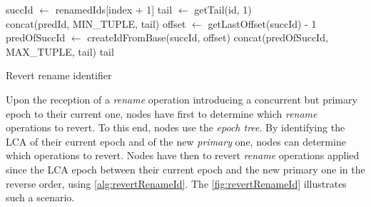 \documentclass[10pt,journal,compsoc]{IEEEtran}
\let\MYoriglatexcaption\caption
\renewcommand{\caption}[2][\relax]{\MYoriglatexcaption[#2]{#2}}
\begin{document}
\begin{myalgorithm}
\begin{algorithmic}
            \State succId $\gets$ renamedIds[index + 1]
            \State tail $\gets$ getTail(id, 1)
            \\
                \State \Return concat(predId, MIN\_TUPLE, tail)
                \State offset $\gets$ getLastOffset(succId) - 1
                \State predOfSuccId $\gets$ createIdFromBase(succId, offset)
                \State \Return concat(predOfSuccId, MAX\_TUPLE, tail)
            \Else
                \State \Return tail
            \EndIf
        \EndFunction
    \end{algorithmic}
    \caption{Revert rename identifier}
    \label{alg:revertRenameId}
\end{myalgorithm}


Upon the reception of a \emph{rename} operation introducing a concurrent but primary epoch to their current one, nodes have first to determine which \emph{rename} operations to revert.
To this end, nodes use the \emph{epoch tree}.
By identifying the \ac{LCA} of their current epoch and of the new \emph{primary} one, nodes can determine which operations to revert.
Nodes have then to revert \emph{rename} operations applied since the \ac{LCA} epoch between their current epoch and the new primary one in the reverse order, using \autoref{alg:revertRenameId}.
The \autoref{fig:revertRenameId} illustrates such a scenario.
\end{document}
